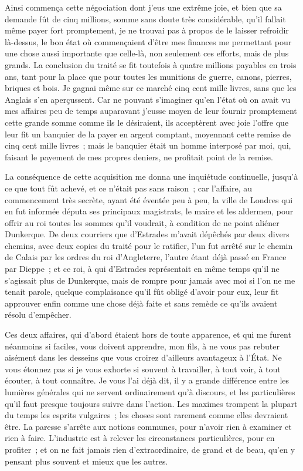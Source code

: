 \documentclass[french,twoside]{book} %
\begin{document}
Ainsi commença cette négociation dont j’eus une extrême joie, et bien que sa demande fût de cinq millions, somme sans doute très considérable, qu’il fallait même payer fort promptement, je ne trouvai pas à propos de le laisser refroidir là-dessus, le bon état où commençaient d’être mes finances me permettant pour une chose aussi importante que celle-là, non seulement ces efforts, mais de plus grands. La conclusion du traité se fit toutefois à quatre millions payables en trois ans, tant pour la place que pour toutes les munitions de guerre, canons, pierres, briques et bois. Je gagnai même sur ce marché cinq cent mille livres, sans que les Anglais s’en aperçussent. Car ne pouvant s’imaginer qu’en l’état où on avait vu mes affaires peu de temps auparavant j’eusse moyen de leur fournir promptement cette grande somme comme ils le désiraient, ils acceptèrent avec joie l’offre que leur fit un banquier de la payer en argent comptant, moyennant cette remise de cinq cent mille livres ; mais le banquier était un homme interposé par moi, qui, faisant le payement de mes propres deniers, ne profitait point de la remise.\par
La conséquence de cette acquisition me donna une inquiétude continuelle, jusqu’à ce que tout fût achevé, et ce n’était pas sans raison ; car l’affaire, au commencement très secrète, ayant été éventée peu à peu, la ville de Londres qui en fut informée députa ses principaux magistrats, le maire et les aldermen, pour offrir au roi toutes les sommes qu’il voudrait, à condition de ne point aliéner Dunkerque. De deux courriers que d’Estrades m’avait dépêchés par deux divers chemins, avec deux copies du traité pour le ratifier, l’un fut arrêté sur le chemin de Calais par les ordres du roi d’Angleterre, l’autre étant déjà passé en France par Dieppe ; et ce roi, à qui d’Estrades représentait en même temps qu’il ne s’agissait plus de Dunkerque, mais de rompre pour jamais avec moi si l’on ne me tenait parole, quelque complaisance qu’il fût obligé d’avoir pour eux, leur fit approuver enfin comme une chose déjà faite et sans remède ce qu’ils avaient résolu d’empêcher.\par
Ces deux affaires, qui d’abord étaient hors de toute apparence, et qui me furent néanmoins si faciles, vous doivent apprendre, mon fils, à ne vous pas rebuter aisément dans les desseins que vous croirez d’ailleurs avantageux à l’État. Ne vous étonnez pas si je vous exhorte si souvent à travailler, à tout voir, à tout écouter, à tout connaître. Je vous l’ai déjà dit, il y a grande différence entre les lumières générales qui ne servent ordinairement qu’à discours, et les particulières qu’il faut presque toujours suivre dans l’action. Les maximes trompent la plupart du temps les esprits vulgaires ; les choses sont rarement comme elles devraient être. La paresse s’arrête aux notions communes, pour n’avoir rien à examiner et rien à faire. L’industrie est à relever les circonstances particulières, pour en profiter ; et on ne fait jamais rien d’extraordinaire, de grand et de beau, qu’en y pensant plus souvent et mieux que les autres.\par
\end{document}
